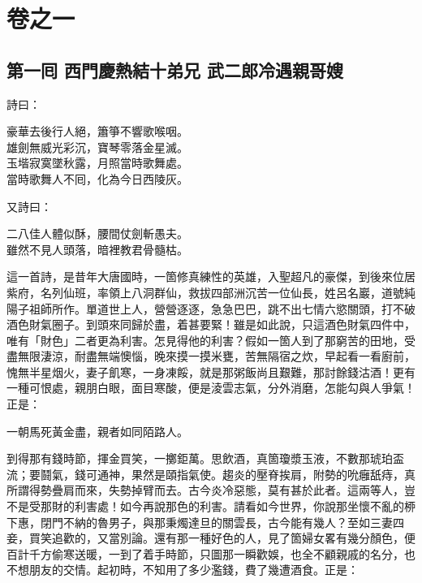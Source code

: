 \part*{{\titlename}卷之一}



\chapter*{第一囘 西門慶熱結十弟兄 武二郎冷遇親哥嫂}


詩曰：

\begin{myquote}
豪華去後行人絕，簫箏不響歌喉咽。\\
雄劍無威光彩沉，寶琴零落金星滅。\\
玉堦寂寞墜秋露，月照當時歌舞處。\\
當時歌舞人不囘，化為今日西陵灰。{}
\end{myquote}

又詩曰：

\begin{myquote}
二八佳人體似酥，腰間仗劍斬愚夫。{}\\
雖然不見人頭落，暗裡教君骨髓枯。
\end{myquote}

這一首詩，是昔年大唐國時，一箇修真練性的英雄，入聖超凡的豪傑，到後來位居紫府，名列仙班，率領上八洞群仙，救拔四部洲沉苦一位仙長，姓呂名巖，道號純陽子祖師所作。單道世上人，營營逐逐，急急巴巴，跳不出七情六慾關頭，打不破酒色財氣圈子。到頭來同歸於盡，着甚要緊！雖是如此說，只這酒色財氣四件中，唯有「財色」二者更為利害。怎見得他的利害？假如一箇人到了那窮苦的田地，受盡無限淒涼，耐盡無端懊惱，晚來摸一摸米甕，苦無隔宿之炊，早起看一看廚前，愧無半星烟火，妻子飢寒，一身凍餒，{}就是那粥飯尚且艱難，那討餘錢沽酒！{}更有一種可恨處，親朋白眼，面目寒酸，便是淩雲志氣，分外消磨，怎能勾與人爭氣！{}正是：

\begin{myquote}
一朝馬死黃金盡，親者如同陌路人。
\end{myquote}

到得那有錢時節，揮金買笑，一擲鉅萬。思飲酒，真箇瓊漿玉液，{}不數那琥珀盃流；要鬪氣，錢可通神，果然是頤指氣使。{}趨炎的壓脊挨肩，附勢的吮癰舐痔，真所謂得勢疊肩而來，失勢掉臂而去。古今炎冷惡態，莫有甚於此者。這兩等人，豈不是受那財的利害處！如今再說那色的利害。{}請看如今世界，你說那坐懷不亂的桺下惠，閉門不納的魯男子，與那秉燭達旦的關雲長，古今能有幾人？至如三妻四妾，買笑追歡的，又當別論。還有那一種好色的人，見了箇婦女畧有幾分顏色，便百計千方偷寒送暖，一到了着手時節，只圖那一瞬歡娛，也全不顧親戚的名分，也不想朋友的交情。起初時，不知用了多少濫錢，費了幾遭酒食。{}正是：

